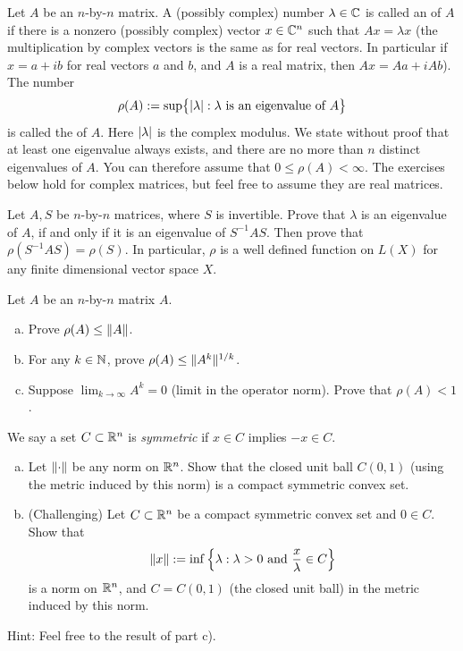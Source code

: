 \begin{exnote}
Let $A$ be an $n$-by-$n$ matrix.
A (possibly complex) number $\lambda \in {\mathbb{C}}$ is called an \emph{} of $A$
if there is a nonzero (possibly complex) vector $x \in {\mathbb{C}}^n$ such that $Ax = \lambda
x$ (the multiplication by complex vectors is the same as for real vectors. In particular if $x =
a+ib$ for real vectors $a$ and $b$, and $A$ is a real matrix, then $Ax = Aa + i Ab$).
The number
\begin{equation*}
\rho(A) :=
\sup \bigl\{ \left\lvert {\lambda} \right\rvert : \lambda \text{ is an eigenvalue of $A$} \bigr\}
\end{equation*}
is called the \emph{} of $A$.  Here $\left\lvert {\lambda} \right\rvert$ is the complex
modulus.  We state without proof that at least one eigenvalue always exists,
and there are no more than $n$ distinct eigenvalues of $A$.  You can
therefore assume that $0 \leq \rho(A) < \infty$.
The exercises below hold for complex matrices, but feel free to assume they
are real matrices.
\end{exnote}

\begin{exercise}
Let $A,S$ be $n$-by-$n$ matrices, where $S$ is invertible.
Prove that $\lambda$ is an eigenvalue of $A$, if and only
if it is an eigenvalue of $S^{-1}AS$.  Then prove that
$\rho(S^{-1}AS) = \rho(S)$.
In particular, $\rho$ is a well defined function on $L(X)$ for
any finite dimensional vector space $X$.
\end{exercise}

\begin{exercise}
Let $A$ be an $n$-by-$n$ matrix $A$.
\begin{enumerate}[a)]
\item
Prove $\rho(A) \leq \lVert {A} \rVert$.
\item
For any $k \in {\mathbb{N}}$, prove
$\rho(A) \leq \lVert {A^k} \rVert^{1/k}$.
\item
Suppose $\displaystyle \lim_{k\to\infty} A^k = 0$ (limit in the operator norm).
Prove that $\rho(A) < 1$.
\end{enumerate}
\end{exercise}

\begin{exercise}
We say a set $C \subset {\mathbb{R}}^n$ is \emph{symmetric} if
$x \in C$ implies $-x \in C$.
\begin{enumerate}[a)]
\item
Let $\lVert {\cdot} \rVert$ be any norm on ${\mathbb{R}}^n$.  Show that the closed unit ball
$C(0,1)$ (using the metric induced by this norm)
is a compact symmetric convex set.
\item (Challenging)
Let $C \subset {\mathbb{R}}^n$ be a compact symmetric convex set and $0 \in C$.  Show that
\begin{equation*}
\lVert {x} \rVert := \inf \left\{ \lambda : \lambda > 0 \text{ and } \frac{x}{\lambda} \in C \right\}
\end{equation*}
is a norm on ${\mathbb{R}}^n$, and $C = C(0,1)$ (the closed unit ball) in the metric induced by this norm.
\end{enumerate}
Hint: Feel free to the result of  part c).
\end{exercise}

